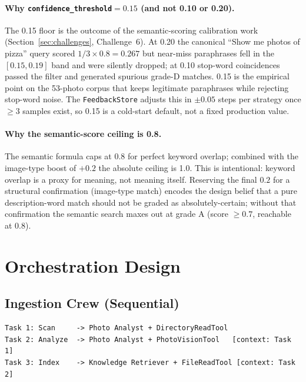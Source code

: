 \documentclass[11pt,letterpaper]{article}
\begin{document}
\paragraph{Why \texttt{confidence\_threshold}$=0.15$ (and not 0.10 or 0.20).} The 0.15 floor is the outcome of the semantic-scoring calibration work (Section~\ref{sec:challenges}, Challenge~6). At 0.20 the canonical ``Show me photos of pizza'' query scored $1/3 \times 0.8 = 0.267$ but near-miss paraphrases fell in the $[0.15, 0.19]$ band and were silently dropped; at 0.10 stop-word coincidences passed the filter and generated spurious grade-D matches. 0.15 is the empirical point on the 53-photo corpus that keeps legitimate paraphrases while rejecting stop-word noise. The \texttt{FeedbackStore} adjusts this in $\pm0.05$ steps per strategy once $\geq 3$ samples exist, so 0.15 is a cold-start default, not a fixed production value.

\paragraph{Why the semantic-score ceiling is 0.8.} The semantic formula caps at $0.8$ for perfect keyword overlap; combined with the image-type boost of $+0.2$ the absolute ceiling is 1.0. This is intentional: keyword overlap is a proxy for meaning, not meaning itself. Reserving the final $0.2$ for a structural confirmation (image-type match) encodes the design belief that a pure description-word match should not be graded as absolutely-certain; without that confirmation the semantic search maxes out at grade A (score $\geq 0.7$, reachable at 0.8).

\section{Orchestration Design}
\label{sec:orchestration}

\subsection{Ingestion Crew (Sequential)}

\begin{lstlisting}[language={},caption={Ingestion pipeline task chain.}]
Task 1: Scan     -> Photo Analyst + DirectoryReadTool
Task 2: Analyze  -> Photo Analyst + PhotoVisionTool   [context: Task 1]
Task 3: Index    -> Knowledge Retriever + FileReadTool [context: Task 2]
\end{lstlisting}
\end{document}

